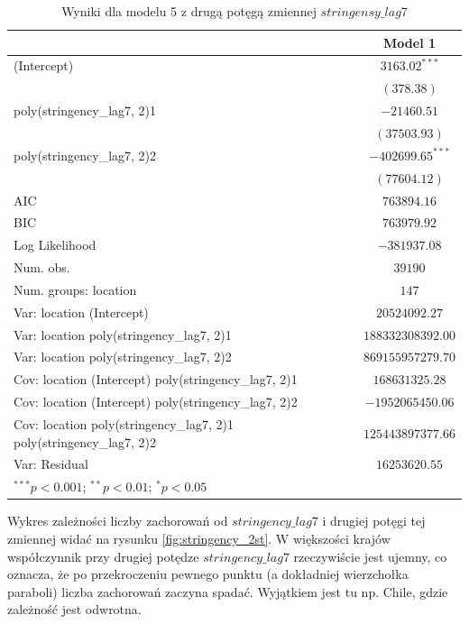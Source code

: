 \documentclass[12pt]{mwbk}
\theoremstyle{plain}
\theoremstyle{definition}
\theoremstyle{remark}
\begin{document}
\begin{table}
	\begin{center}
		\begin{tabular}{l c}
			\hline
			& Model 1 \\
			\hline
			(Intercept)                                                         & $3163.02^{***}$    \\
			& $(378.38)$         \\
			poly(stringency\_lag7, 2)1                                          & $-21460.51$        \\
			& $(37503.93)$       \\
			poly(stringency\_lag7, 2)2                                          & $-402699.65^{***}$ \\
			& $(77604.12)$       \\
			\hline
			AIC                                                                 & $763894.16$        \\
			BIC                                                                 & $763979.92$        \\
			Log Likelihood                                                      & $-381937.08$       \\
			Num. obs.                                                           & $39190$            \\
			Num. groups: location                                               & $147$              \\
			Var: location (Intercept)                                           & $20524092.27$      \\
			Var: location poly(stringency\_lag7, 2)1                            & $188332308392.00$  \\
			Var: location poly(stringency\_lag7, 2)2                            & $869155957279.70$  \\
			Cov: location (Intercept) poly(stringency\_lag7, 2)1                & $168631325.28$     \\
			Cov: location (Intercept) poly(stringency\_lag7, 2)2                & $-1952065450.06$   \\
			Cov: location poly(stringency\_lag7, 2)1 poly(stringency\_lag7, 2)2 & $125443897377.66$  \\
			Var: Residual                                                       & $16253620.55$      \\
			\hline
			\multicolumn{2}{l}{\scriptsize{$^{***}p<0.001$; $^{**}p<0.01$; $^{*}p<0.05$}}
		\end{tabular}
		\caption{Wyniki dla modelu 5 z drugą potęgą zmiennej $stringensy\_lag7$}
		\label{table:mod5-2st}
	\end{center}
\end{table}
\newpage
Wykres zależności liczby zachorowań od $stringency\_lag7$ i drugiej potęgi tej zmiennej widać na rysunku \ref{fig:stringency_2st}. W większości krajów współczynnik przy drugiej potędze $stringency\_lag7$ rzeczywiście jest ujemny, co oznacza, że po przekroczeniu pewnego punktu (a dokładniej wierzchołka paraboli) liczba zachorowań zaczyna spadać. Wyjątkiem jest tu np. Chile, gdzie zależność jest odwrotna.
\end{document}
